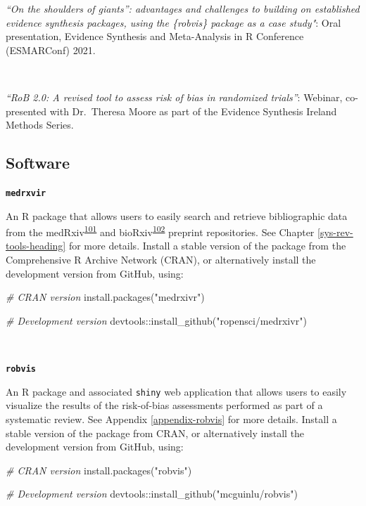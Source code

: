 \documentclass[a4paper, twoside]{templates/ociamthesis}
\newenvironment{Shaded}{\begin{snugshade}}{\end{snugshade}}
\newcommand{\CommentTok}[1]{\textcolor[rgb]{0.56,0.35,0.01}{\textit{#1}}}
\newcommand{\FunctionTok}[1]{\textcolor[rgb]{0.00,0.00,0.00}{#1}}
\newcommand{\NormalTok}[1]{#1}
\newcommand{\SpecialCharTok}[1]{\textcolor[rgb]{0.00,0.00,0.00}{#1}}
\newcommand{\StringTok}[1]{\textcolor[rgb]{0.31,0.60,0.02}{#1}}
\renewenvironment{Shaded}
{
  \vspace{4pt}%
  \begin{snugshade}%
}{%
  \end{snugshade}%
  \vspace{4pt}%
}
\begin{document}
\emph{``On the shoulders of giants'': advantages and challenges to building on established evidence synthesis packages, using the \{robvis\} package as a case study"}: Oral presentation, Evidence Synthesis and Meta-Analysis in R Conference (ESMARConf) 2021.

~

\emph{``RoB 2.0: A revised tool to assess risk of bias in randomized trials''}: Webinar, co-presented with Dr.~Theresa Moore as part of the Evidence Synthesis Ireland Methods Series.

\hypertarget{outputs-software}{%
\subsection{Software}\label{outputs-software}}

\textbf{\texttt{medrxvir}}

An R package that allows users to easily search and retrieve bibliographic data from the medRxiv\textsuperscript{\protect\hyperlink{ref-rawlinson2019}{101}} and bioRxiv\textsuperscript{\protect\hyperlink{ref-sever2019}{102}} preprint repositories. See Chapter \ref{sys-rev-tools-heading} for more details. Install a stable version of the package from the Comprehensive R Archive Network (CRAN), or alternatively install the development version from GitHub, using:

\begin{Shaded}
\begin{Highlighting}[]
\CommentTok{\# CRAN version}
\FunctionTok{install.packages}\NormalTok{(}\StringTok{"medrxivr"}\NormalTok{)}

\CommentTok{\# Development version}
\NormalTok{devtools}\SpecialCharTok{::}\FunctionTok{install\_github}\NormalTok{(}\StringTok{"ropensci/medrxivr"}\NormalTok{)}
\end{Highlighting}
\end{Shaded}

~

\textbf{\texttt{robvis}}

An R package and associated \texttt{shiny} web application that allows users to easily visualize the results of the risk-of-bias assessments performed as part of a systematic review. See Appendix \ref{appendix-robvis} for more details. Install a stable version of the package from CRAN, or alternatively install the development version from GitHub, using:

\begin{Shaded}
\begin{Highlighting}[]
\CommentTok{\# CRAN version}
\FunctionTok{install.packages}\NormalTok{(}\StringTok{"robvis"}\NormalTok{)}

\CommentTok{\# Development version}
\NormalTok{devtools}\SpecialCharTok{::}\FunctionTok{install\_github}\NormalTok{(}\StringTok{"mcguinlu/robvis"}\NormalTok{)}
\end{Highlighting}
\end{Shaded}
\end{document}
